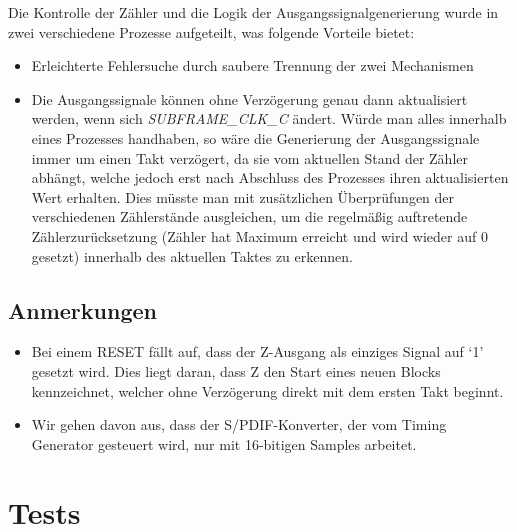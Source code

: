 \documentclass[12pt,a4paper]{article}
\begin{document}
Die Kontrolle der Zähler und die Logik der Ausgangssignalgenerierung wurde in zwei verschiedene Prozesse aufgeteilt, was folgende Vorteile bietet:
\begin{itemize}
\item Erleichterte Fehlersuche durch saubere Trennung der zwei Mechanismen
\item Die Ausgangssignale können ohne Verzögerung genau dann aktualisiert werden, wenn sich \emph{SUBFRAME\_CLK\_C} ändert. Würde man alles innerhalb eines Prozesses handhaben, so wäre die Generierung der Ausgangssignale immer um einen Takt verzögert, da sie vom aktuellen Stand der Zähler abhängt, welche jedoch erst nach Abschluss des Prozesses ihren aktualisierten Wert erhalten. Dies müsste man mit zusätzlichen Überprüfungen der verschiedenen Zählerstände ausgleichen, um die regelmäßig auftretende Zählerzurücksetzung (Zähler hat Maximum erreicht und wird wieder auf 0 gesetzt) innerhalb des aktuellen Taktes zu erkennen.
\end{itemize}


\subsection{Anmerkungen}
\begin{itemize}
\item Bei einem RESET fällt auf, dass der Z-Ausgang als einziges Signal auf ‘1’ gesetzt wird. Dies liegt daran, dass Z den Start eines neuen Blocks kennzeichnet, welcher ohne Verzögerung direkt mit dem ersten Takt beginnt.
\item Wir gehen davon aus, dass der S/PDIF-Konverter, der vom Timing Generator gesteuert wird, nur mit 16-bitigen Samples arbeitet.
\end{itemize}

\section{Tests}
\end{document}
